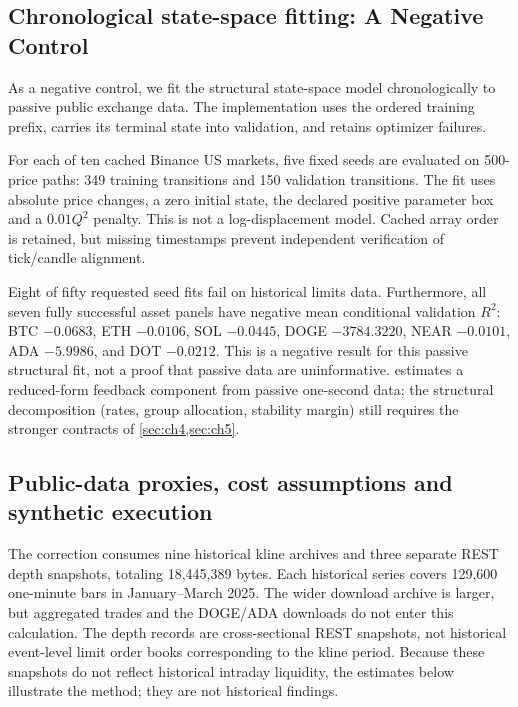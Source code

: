 \documentclass[10pt,twocolumn,letterpaper]{article}
\theoremstyle{definition}
\theoremstyle{remark}
\begin{document}
\subsection{Chronological state-space fitting: A Negative Control}
\label{sec:binance_multi_epoch}
As a negative control, we fit the structural state-space model chronologically to passive public exchange data. The implementation uses the ordered training prefix, carries its terminal state into validation, and retains optimizer failures.

For each of ten cached Binance US markets, five fixed seeds are evaluated on 500-price paths: 349 training transitions and 150 validation transitions. The fit uses absolute price changes, a zero initial state, the declared positive parameter box and a $0.01Q^2$ penalty. This is not a log-displacement model. Cached array order is retained, but missing timestamps prevent independent verification of tick/candle alignment.

Eight of fifty requested seed fits fail on historical limits data. Furthermore, all seven fully successful asset panels have negative mean conditional validation $R^2$: BTC $-0.0683$, ETH $-0.0106$, SOL $-0.0445$, DOGE $-3784.3220$, NEAR $-0.0101$, ADA $-5.9986$, and DOT $-0.0212$. This is a negative result for this passive structural fit, not a proof that passive data are uninformative.  estimates a reduced-form feedback component from passive one-second data; the structural decomposition (rates, group allocation, stability margin) still requires the stronger contracts of \cref{sec:ch4,sec:ch5}.

\subsection{Public-data proxies, cost assumptions and synthetic execution}
\label{sec:gate24_empirical}
The correction consumes nine historical kline archives and three separate REST depth snapshots, totaling 18,445,389 bytes. Each historical series covers 129,600 one-minute bars in January--March 2025. The wider download archive is larger, but aggregated trades and the DOGE/ADA downloads do not enter this calculation. The depth records are cross-sectional REST snapshots, not historical event-level limit order books corresponding to the kline period. Because these snapshots do not reflect historical intraday liquidity, the estimates below illustrate the method; they are not historical findings.
\end{document}
